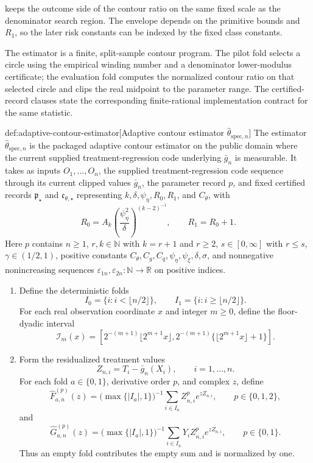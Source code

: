  keeps the outcome side of the contour ratio on the same fixed scale as the denominator search region. The envelope depends on the primitive bounds and \(R_1\), so the later risk constants can be indexed by the fixed class constants.

The estimator is a finite, split-sample contour program. The pilot fold selects a circle using the empirical winding number and a denominator lower-modulus certificate; the evaluation fold computes the normalized contour ratio on that selected circle and clips the real midpoint to the parameter range. The certified-record clauses state the corresponding finite-rational implementation contract for the same statistic.

\begin{algorithmv}{def:adaptive-contour-estimator}[Adaptive contour estimator \(\widehat\theta_{\mathrm{spec},n}\)]
The estimator \(\widehat\theta_{\mathrm{spec},n}\) is the packaged adaptive contour estimator on the public domain where the current supplied treatment-regression code underlying \(\bar g_n\) is measurable. It takes as inputs \(O_1,\ldots,O_n\), the supplied treatment-regression code sequence through its current clipped values \(\bar g_n\), the parameter record \(p\), and fixed certified records \(\mathfrak p_{\star}\) and \(\mathfrak c_{\theta,\star}\) representing \(k,\delta,\psi_{\eta},R_0,R_1\), and \(C_{\theta}\), with
\[
R_0=A_k\left(\frac{\psi_{\eta}^2}{\delta}\right)^{(k-2)^{-1}},
\qquad
R_1=R_0+1.
\]
Here \(p\) contains \(n\ge1\), \(r,k\in\mathbb N\) with \(k=r+1\) and \(r\ge2\), \(s\in[0,\infty]\) with \(r\le s\), \(\gamma\in(1/2,1)\), positive constants \(C_{\theta},C_g,C_q,\psi_{\eta},\psi_{\xi},\delta,\sigma\), and nonnegative nonincreasing sequences \(\varepsilon_{1n},\varepsilon_{2n}:\mathbb N\to\mathbb R\) on positive indices.

\begin{enumerate}
\item Define the deterministic folds
\[
I_0=\{i:i<\lfloor n/2\rfloor\},
\qquad
I_1=\{i:i\ge\lfloor n/2\rfloor\}.
\]
For each real observation coordinate \(x\) and integer \(m\ge0\), define the floor-dyadic interval
\[
\mathcal I_m(x)=
\left[
2^{-(m+1)}\lfloor2^{m+1} x\rfloor,
2^{-(m+1)}\{\lfloor2^{m+1} x\rfloor+1\}
\right].
\]

\item Form the residualized treatment values
\[
Z_{n,i}=T_i-\bar g_n(X_i),
\qquad i=1,\ldots,n.
\]
For each fold \(a\in\{0,1\}\), derivative order \(p\), and complex \(z\), define
\[
\widehat F_{a,n}^{(p)}(z)
=
\bigl(\max\{|I_a|,1\}\bigr)^{-1}\sum_{i\in I_a}Z_{n,i}^{p}e^{zZ_{n,i}},
\qquad p\in\{0,1,2\},
\]
and
\[
\widehat G_{a,n}^{(p)}(z)
=
\bigl(\max\{|I_a|,1\}\bigr)^{-1}\sum_{i\in I_a}Y_iZ_{n,i}^{p}e^{zZ_{n,i}},
\qquad p\in\{0,1\}.
\]
Thus an empty fold contributes the empty sum and is normalized by one.


\end{enumerate}
\end{algorithmv}
